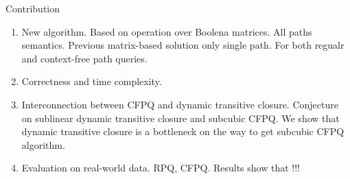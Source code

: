 Contribution
\begin{enumerate}
	\item New algorithm. Based on operation over Boolena matrices. All paths semantics. Previous matrix-based solution only single path. For both regualr and context-free path queries.
	\item Correctness and time complexity.
	\item Interconnection between CFPQ and dynamic transitive closure. Conjecture on sublinear dynamic transitive closure and subcubic CFPQ. We show that dynamic transitive closure is a bottleneck on the way to get subcubic CFPQ algorithm.
	\item Evaluation on real-world data. RPQ, CFPQ. Results show that !!!
\end{enumerate}
